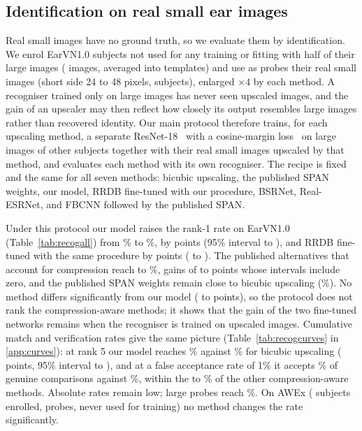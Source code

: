 \subsection{Identification on real small ear images}
\label{sec:recog}
Real small images have no ground truth, so we evaluate them by identification. We enrol \RecEnrolled{} EarVN1.0 subjects not used for any training or fitting with half of their large images (\RecGallery{} images, averaged into templates) and use as probes their \RecProbes{} real small images (short side 24 to 48 pixels, \RecSubj{} subjects), enlarged $\times4$ by each method. A recogniser trained only on large images has never seen upscaled images, and the gain of an upscaler may then reflect how closely its output resembles large images rather than recovered identity. Our main protocol therefore trains, for each upscaling method, a separate ResNet-18~\cite{he2016resnet} with a cosine-margin loss~\cite{wang2018cosface} on large images of \RecTrainSubj{} other subjects together with their \RecUpNSmall{} real small images upscaled by that method, and evaluates each method with its own recogniser. The recipe is fixed and the same for all seven methods: bicubic upscaling, the published SPAN weights, our model, RRDB fine-tuned with our procedure, BSRNet, Real-ESRNet, and FBCNN followed by the published SPAN.

Under this protocol our model raises the rank-1 rate on EarVN1.0 (Table~\ref{tab:recogall}) from \RecUpEarvnBic{}\% to \RecUpEarvnEst{}\%, by \RecUpEarvnGain{} points (95\% interval \RecUpEarvnGainLo{} to \RecUpEarvnGainHi{}), and RRDB fine-tuned with the same procedure by \RecAllEarvnRrdbGain{} points (\RecAllEarvnRrdbGainLo{} to \RecAllEarvnRrdbGainHi{}). The published alternatives that account for compression reach \RecAllEarvnAltRankMin{} to \RecAllEarvnAltRankMax{}\%, gains of \RecAllEarvnAltGainMin{} to \RecAllEarvnAltGainMax{} points whose intervals include zero, and the published SPAN weights remain close to bicubic upscaling (\RecUpEarvnPub{}\%). No method differs significantly from our model (\RecAllEarvnVsEstMin{} to \RecAllEarvnVsEstMax{} points), so the protocol does not rank the compression-aware methods; it shows that the gain of the two fine-tuned networks remains when the recogniser is trained on upscaled images. Cumulative match and verification rates give the same picture (Table~\ref{tab:recogcurves} in \ref{app:curves}): at rank 5 our model reaches \RecCurveCmcFiveEst{}\% against \RecCurveCmcFiveBic{}\% for bicubic upscaling (\RecCurveCmcFiveGain{} points, 95\% interval \RecCurveCmcFiveGainLo{} to \RecCurveCmcFiveGainHi{}), and at a false acceptance rate of 1\% it accepts \RecCurveTarEst{}\% of genuine comparisons against \RecCurveTarBic{}\%, within the \RecCurveTarAltMin{} to \RecCurveTarAltMax{}\% of the other compression-aware methods. Absolute rates remain low; large probes reach \RecUpEarvnRef{}\%. On AWEx (\RecAwexEnrolled{} subjects enrolled, \RecAwexProbes{} probes, never used for training) no method changes the rate significantly.

